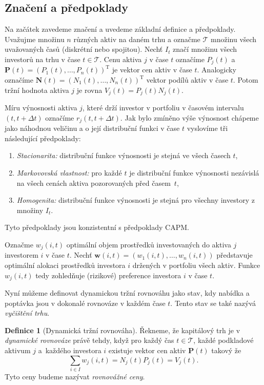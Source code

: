 \documentclass[a4paper,12pt]{report}
\theoremstyle{definition} \newtheorem{definice}[veta]{Definice}
\theoremstyle{remark}
\begin{document}
\subsection{Značení a předpoklady}
Na začátek zavedeme značení a  uvedeme základní definice a předpoklady. 
Uvažujme množinu $n$ různých aktiv na daném trhu a označme $\mathcal{T}$ množinu všech uvažovaných časů (diskrétní nebo spojitou).
Nechť $I_t$ značí množinu všech investorů na trhu v čase $t\in \mathcal{T}$.
Cenu aktiva $j$ v čase $t$ označíme $P_j(t)$ a $\boldsymbol{P}(t)=(P_1(t),\dots,P_n(t))^\mathrm{T}$ je vektor cen aktiv v čase $t$.
Analogicky označíme $\boldsymbol{N}(t)=(N_1(t),\dots,N_n(t))^\mathrm{T}$ vektor podílů aktiv v čase $t$.
Potom tržní hodnota aktiva $j$ je rovna $V_j(t)=P_j(t)N_j(t)$.

Míru výnosnosti aktiva $j$, které drží investor v portfoliu v časovém intervalu $(t,t+\Delta t)$ označíme $r_j(t,t+\Delta t)$.
Jak bylo zmíněno výše výnosnost chápeme jako náhodnou veličinu a o její distribuční funkci v čase $t$ vyslovíme tři následující předpoklady:
\begin{enumerate}
\item \label{Stacionarita} \textit{Stacionarita:} distribuční funkce výnosnosti  je stejná ve všech časech $t$,                                                                            
\item \label{Martingalvl} \textit{Markovovská vlastnost:} pro každé $t$ je distribuční funkce výnosnosti nezávislá na všech cenách aktiva pozorovaných před časem~$t$,
\item \label{Homogenita} \textit{Homogenita:} distribuční funkce výnosnosti je stejná pro všechny investory z množiny $I_t$. 
\end{enumerate} 
Tyto předpoklady jsou konzistentní s předpoklady CAPM.

Označme $w_{j}(i,t)$ optimální objem prostředků investovaných do aktiva $j$ investorem $i$ v čase $t$.
Nechť $\boldsymbol{w}(i,t)=(w_{1}(i,t),\dots,w_{n}(i,t))$ představuje optimální alokaci prostředků investora $i$ držených v portfoliu všech aktiv.
Funkce $w_{j}(i,t)$ tedy zohledňuje (rizikové) preference investora $i$ v čase $t$.
  
Nyní můžeme definovat dynamickou tržní rovnováhu jako stav, kdy  nabídka a poptávka jsou v dokonalé rovnováze v každém čase $t$.
Tento stav se také nazývá \textit{vyčištění trhu}.
         
\begin{definice}[Dynamická tržní rovnováha]
Řekneme, že kapitálový trh je v \textit{dynamické rovnováze} právě tehdy, když pro každý čas $t\in \mathcal{T}$, každé podkladové aktivum $j$ a~každého investora $i$ existuje vektor cen aktiv $\boldsymbol{P}(t)$ takový že
$$\sum_{i\in I} w_{j}(i,t)=N_j(t)P_j(t)=V_j(t).$$
Tyto ceny budeme nazývat \textit{rovnovážné ceny}.
\end{definice}
\end{document}
